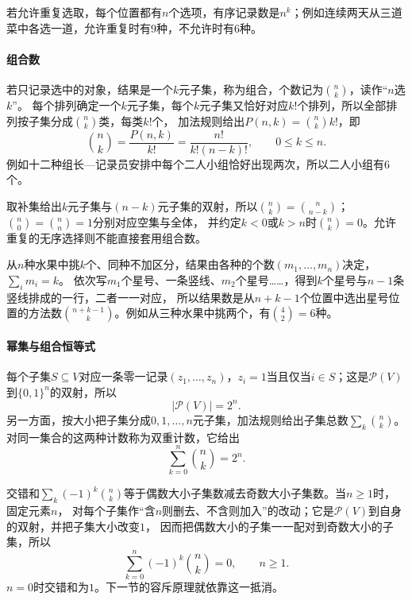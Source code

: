 若允许重复选取，每个位置都有$n$个选项，有序记录数是$n^k$；例如连续两天从三道菜中各选一道，允许重复时有$9$种，不允许时有$6$种。

\paragraph{组合数}
若只记录选中的对象，结果是一个$k$元子集，称为组合，个数记为$\binom nk$，读作“$n$选$k$”。
每个排列确定一个$k$元子集，每个$k$元子集又恰好对应$k!$个排列，所以全部排列按子集分成$\binom nk$类，每类$k!$个，
加法规则给出$P(n,k)=\binom nk k!$，即
\begin{equation}
 \binom nk=\frac{P(n,k)}{k!}=\frac{n!}{k!(n-k)!},\qquad 0\leq k\leq n.
 \label{eq:prelim-binomial-coefficient}
\end{equation}
例如十二种组长—记录员安排中每个二人小组恰好出现两次，所以二人小组有$6$个。

取补集给出$k$元子集与$(n-k)$元子集的双射，所以$\binom nk=\binom n{n-k}$；$\binom n0=\binom nn=1$分别对应空集与全体，
并约定$k<0$或$k>n$时$\binom nk=0$。允许重复的无序选择则不能直接套用组合数。

从$n$种水果中挑$k$个、同种不加区分，结果由各种的个数$(m_1,\ldots,m_n)$决定，$\sum_im_i=k$。
依次写$m_1$个星号、一条竖线、$m_2$个星号……，得到$k$个星号与$n-1$条竖线排成的一行，二者一一对应，
所以结果数是从$n+k-1$个位置中选出星号位置的方法数$\binom{n+k-1}{k}$。例如从三种水果中挑两个，有$\binom42=6$种。

\paragraph{幂集与组合恒等式}
\label{sec:comb-ordered-unordered}
每个子集$S\subseteq V$对应一条零一记录$(z_1,\ldots,z_n)$，$z_i=1$当且仅当$i\in S$；这是$\mathcal P(V)$到$\{0,1\}^n$的双射，所以
\begin{equation}
 |\mathcal P(V)|=2^n.
 \label{eq:comb-power-set-count}
\end{equation}
另一方面，按大小把子集分成$0,1,\ldots,n$元子集，加法规则给出子集总数$\sum_k\binom nk$。对同一集合的这两种计数称为双重计数，它给出
\[
 \sum_{k=0}^n\binom nk=2^n.
\]

交错和$\sum_k(-1)^k\binom nk$等于偶数大小子集数减去奇数大小子集数。当$n\geq1$时，固定元素$n$，
对每个子集作“含$n$则删去、不含则加入”的改动；它是$\mathcal P(V)$到自身的双射，并把子集大小改变$1$，
因而把偶数大小的子集一一配对到奇数大小的子集，所以
\begin{equation}
 \sum_{k=0}^n(-1)^k\binom nk=0,\qquad n\geq1.
 \label{eq:comb-alternating-subset-count}
\end{equation}
$n=0$时交错和为$1$。下一节的容斥原理就依靠这一抵消。

